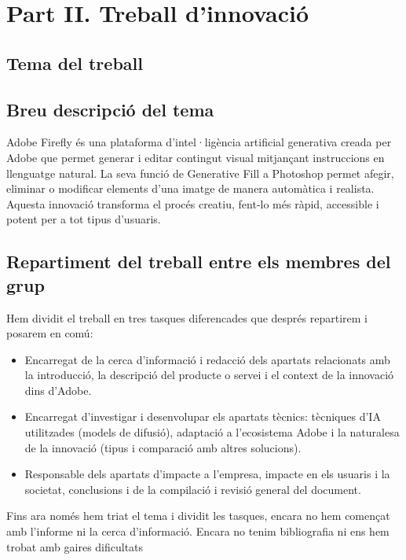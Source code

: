 \clearpage
\section{Part II. Treball d'innovació}


\subsection{Tema del treball}

\subsection{Breu descripció del tema}
Adobe Firefly és una plataforma d’intel·ligència artificial generativa creada per Adobe que permet generar i editar contingut visual mitjançant instruccions en llenguatge natural. La seva funció de Generative Fill a Photoshop permet afegir, eliminar o modificar elements d’una imatge de manera automàtica i realista. Aquesta innovació transforma el procés creatiu, fent-lo més ràpid, accessible i potent per a tot tipus d’usuaris.

\subsection{Repartiment del treball entre els membres del grup}

Hem dividit el treball en tres tasques diferencades que després repartirem i posarem en comú:

\begin{itemize}
    \item Encarregat de la cerca d’informació i redacció dels apartats relacionats amb la introducció, la descripció del producte o servei i el context de la innovació dins d’Adobe.
    \item Encarregat d'investigar i desenvolupar els apartats tècnics: tècniques d’IA utilitzades (models de difusió), adaptació a l’ecosistema Adobe i la naturalesa de la innovació (tipus i comparació amb altres solucions).
    \item Responsable dels apartats d’impacte a l’empresa, impacte en els usuaris i la societat, conclusions i de la compilació i revisió general del document.
    
\end{itemize}

Fins ara només hem triat el tema i dividit les tasques, encara no hem començat amb l'informe ni la cerca d'informació. Encara no tenim bibliografia ni ens hem trobat amb gaires dificultats

